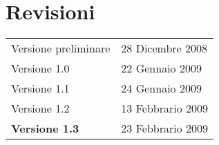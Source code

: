 \chapter*{Revisioni}

\begin{table}[htbp]
\begin{center}
\begin{tabular}{ll}
Versione preliminare & 28 Dicembre 2008 \\
Versione 1.0 & 22 Gennaio 2009  \\ 
Versione 1.1 & 24 Gennaio 2009        \\
Versione 1.2 & 13 Febbrario 2009     \\
\textbf{Versione 1.3} & 23 Febbrario 2009 \\
\end{tabular}
\end{center}
\end{table}


